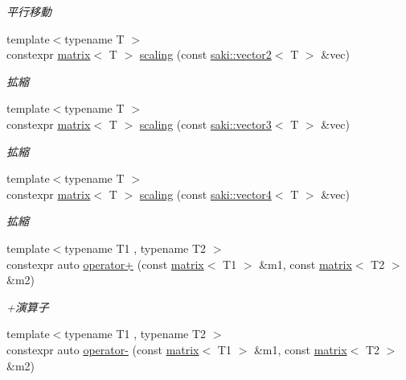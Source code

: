 \begin{DoxyCompactItemize}
\begin{DoxyCompactList}\small\item\em 平行移動 \end{DoxyCompactList}\item 
{\footnotesize template$<$typename T $>$ }\\constexpr \mbox{\hyperlink{classsaki_1_1matrix}{matrix}}$<$ T $>$ \mbox{\hyperlink{namespacesaki_abda5ab30bf4dc9240857d62d56e590f9}{scaling}} (const \mbox{\hyperlink{classsaki_1_1vector2}{saki\+::vector2}}$<$ T $>$ \&vec)
\begin{DoxyCompactList}\small\item\em 拡縮 \end{DoxyCompactList}\item 
{\footnotesize template$<$typename T $>$ }\\constexpr \mbox{\hyperlink{classsaki_1_1matrix}{matrix}}$<$ T $>$ \mbox{\hyperlink{namespacesaki_affcd920fe27abc17e5fa50f04bfabe05}{scaling}} (const \mbox{\hyperlink{classsaki_1_1vector3}{saki\+::vector3}}$<$ T $>$ \&vec)
\begin{DoxyCompactList}\small\item\em 拡縮 \end{DoxyCompactList}\item 
{\footnotesize template$<$typename T $>$ }\\constexpr \mbox{\hyperlink{classsaki_1_1matrix}{matrix}}$<$ T $>$ \mbox{\hyperlink{namespacesaki_aededd0f357c48d1e96af77b06cb3e786}{scaling}} (const \mbox{\hyperlink{classsaki_1_1vector4}{saki\+::vector4}}$<$ T $>$ \&vec)
\begin{DoxyCompactList}\small\item\em 拡縮 \end{DoxyCompactList}\item 
{\footnotesize template$<$typename T1 , typename T2 $>$ }\\constexpr auto \mbox{\hyperlink{namespacesaki_a10eb3090250dfcb43dd1c7579b6b473c}{operator+}} (const \mbox{\hyperlink{classsaki_1_1matrix}{matrix}}$<$ T1 $>$ \&m1, const \mbox{\hyperlink{classsaki_1_1matrix}{matrix}}$<$ T2 $>$ \&m2)
\begin{DoxyCompactList}\small\item\em +演算子 \end{DoxyCompactList}\item 
{\footnotesize template$<$typename T1 , typename T2 $>$ }\\constexpr auto \mbox{\hyperlink{namespacesaki_aa7474901f1f0d3a80142ed713b75ed5e}{operator-\/}} (const \mbox{\hyperlink{classsaki_1_1matrix}{matrix}}$<$ T1 $>$ \&m1, const \mbox{\hyperlink{classsaki_1_1matrix}{matrix}}$<$ T2 $>$ \&m2)

\end{DoxyCompactItemize}

